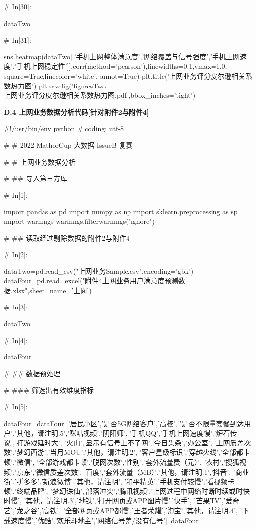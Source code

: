 \documentclass{MathorCupmodeling}
\begin{document}
\begin{python}
# In[30]:


dataTwo


# In[31]:


sns.heatmap(dataTwo[['手机上网整体满意度','网络覆盖与信号强度','手机上网速度','手机上网稳定性']].corr(method='pearson'),linewidths=0.1,vmax=1.0, square=True,linecolor='white', annot=True)
plt.title('上网业务评分皮尔逊相关系数热力图')
plt.savefig('figuresTwo\\[附件2]上网业务评分皮尔逊相关系数热力图.pdf',bbox_inches='tight')

\end{python}
\newpage
\textbf{D.4 上网业务数据分析代码[针对附件2与附件4]}
\begin{python}
#!/usr/bin/env python
# coding: utf-8

# # 2022 MathorCup 大数据 IssueB 复赛

# # 上网业务数据分析

# ## 导入第三方库

# In[1]:


import pandas as pd
import numpy as np
import sklearn.preprocessing as sp
import warnings
warnings.filterwarnings("ignore")


# ## 读取经过剔除数据的附件2与附件4

# In[2]:


dataTwo=pd.read_csv("上网业务Sample.csv",encoding='gbk')
dataFour=pd.read_excel("附件4上网业务用户满意度预测数据.xlsx",sheet_name='上网')


# In[3]:


dataTwo


# In[4]:


dataFour


# ## 数据预处理

# ### 筛选出有效维度指标

# In[5]:


dataFour=dataFour[['居民小区','是否5G网络客户','高校',
                   '是否不限量套餐到达用户','其他，请注明.5','咪咕视频','阴阳师',
                   '手机QQ','手机上网速度慢','炉石传说','打游戏延时大',
                   '火山','显示有信号上不了网','今日头条','办公室',
                   '上网质差次数','梦幻西游','当月MOU','其他，请注明.2',
                   '客户星级标识','穿越火线','全部都卡顿','微信',
                   '全部游戏都卡顿','脱网次数','性别','套外流量费（元）',
                   '农村','搜狐视频','京东','微信质差次数',
                   '百度','套外流量（MB）','其他，请注明.1','抖音',
                   '商业街','拼多多','新浪微博','其他，请注明',
                   '和平精英','手机支付较慢','看视频卡顿','终端品牌',
                   '梦幻诛仙','部落冲突','腾讯视频','上网过程中网络时断时续或时快时慢',
                   '其他，请注明.3','地铁','打开网页或APP图片慢','快手',
                   '芒果TV','爱奇艺','龙之谷','高铁',
                   '全部网页或APP都慢','王者荣耀','淘宝','其他，请注明.4',
                   '下载速度慢','优酷','欢乐斗地主','网络信号差/没有信号']]
dataFour



\end{python}
\end{document}
